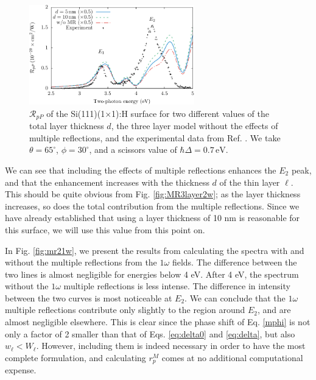 \begin{figure}[t]
\centering
\includegraphics[width=0.64\textwidth]{content/figures/fig-Si1x1-MRthickness}
\caption[$\mathcal{R}_{pP}$ of the Si(111)(1$\times$1):H surface for two
thickness values $d$ of the thin layer $\ell$.] {$\mathcal{R}_{pP}$ of the
Si(111)(1$\times$1):H surface for two different values of the total layer
thickness $d$, the three layer model without the effects of multiple
reflections, and the experimental data from Ref.
\cite{mejiaPRB02}. We take $\theta=65^{\circ}$, $\phi=30^{\circ}$, and a
scissors value of $\hbar\Delta = 0.7\,\text{eV}$.}
\label{fig:average}
\end{figure}

We can see that including the effects of multiple reflections enhances the
$E_{2}$ peak, and that the enhancement increases with the thickness $d$ of the
thin layer $\ell$. This should be quite obvious from Fig.
\ref{fig:MR3layer2w}; as the layer thickness increases, so does the total
contribution from the multiple reflections. Since we have already established
that using a layer thickness of 10 nm is reasonable for this surface, we will use
this value from this point on.

In Fig. \ref{fig:mr21w}, we present the results from calculating the spectra with
and without the multiple reflections from the $1\omega$ fields. The difference
between the two lines is almost negligible for energies below 4 eV. After 4 eV,
the spectrum without the $1\omega$ multiple reflections is less intense. The
difference in intensity between the two curves is most noticeable at $E_{2}$. We
can conclude that the $1\omega$ multiple reflections contribute only slightly to
the region around $E_{2}$, and are almost negligible elsewhere. This is clear
since the phase shift of Eq. \eqref{mphi} is not only a factor of 2 smaller than
that of Eqs. \eqref{eq:delta0} and \eqref{eq:delta}, but also $w_\ell < W_\ell$.
However, including them is indeed necessary in order to have the most complete
formulation, and calculating $r^{M}_{p}$ comes at no additional computational
expense.

